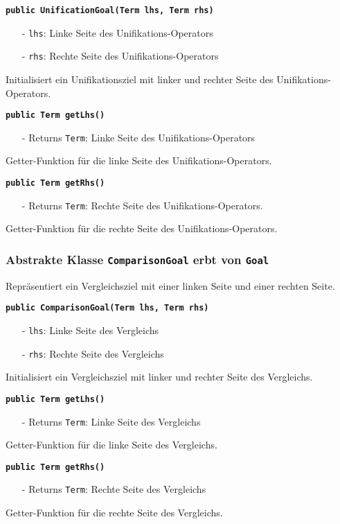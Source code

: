 \documentclass[parskip=full,11pt,twoside]{scrartcl}
\begin{document}
\textbf{\texttt{public UnificationGoal(Term lhs, Term rhs)}}
\begin{itemize}[noitemsep]
	\item[-] \texttt{lhs}: Linke Seite des Unifikations-Operators
	\item[-] \texttt{rhs}: Rechte Seite des Unifikations-Operators
\end{itemize}
Initialisiert ein Unifikationsziel mit linker und rechter Seite des Unifikations-Operators.

\textbf{\texttt{public Term getLhs()}}
\begin{itemize}[noitemsep]
	\item[-] Returns \texttt{Term}: Linke Seite des Unifikations-Operators
\end{itemize}
Getter-Funktion für die linke Seite des Unifikations-Operators.

\textbf{\texttt{public Term getRhs()}}
\begin{itemize}[noitemsep]
	\item[-] Returns \texttt{Term}: Rechte Seite des Unifikations-Operators.
\end{itemize}
Getter-Funktion für die rechte Seite des Unifikations-Operators.

\subsubsection{Abstrakte Klasse \texttt{ComparisonGoal} erbt von \texttt{Goal}}
Repräsentiert ein Vergleichsziel mit einer linken Seite und einer rechten Seite.

\textbf{\texttt{public ComparisonGoal(Term lhs, Term rhs)}}
\begin{itemize}[noitemsep]
	\item[-] \texttt{lhs}: Linke Seite des Vergleichs
	\item[-] \texttt{rhs}: Rechte Seite des Vergleichs
\end{itemize}
Initialisiert ein Vergleichsziel mit linker und rechter Seite des Vergleichs.

\textbf{\texttt{public Term getLhs()}}
\begin{itemize}[noitemsep]
	\item[-] Returns \texttt{Term}: Linke Seite des Vergleichs
\end{itemize}
Getter-Funktion für die linke Seite des Vergleichs.

\textbf{\texttt{public Term getRhs()}}
\begin{itemize}[noitemsep]
	\item[-] Returns \texttt{Term}: Rechte Seite des Vergleichs
\end{itemize}
Getter-Funktion für die rechte Seite des Vergleichs.
\end{document}
